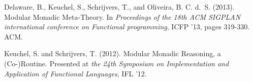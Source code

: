 \begin{center}
  \begin{minipage}{0.8\columnwidth}
    Delaware, B., Keuchel, S., Schrijvers, T., and Oliveira,
    B. C. d.~S. (2013).
    \newblock Modular Monadic Meta-Theory.
    \newblock In {\em Proceedings of the 18th ACM SIGPLAN international
      conference on Functional programming}, ICFP '13, pages 319-330. ACM.
  \end{minipage}
\end{center}

\begin{center}
  \begin{minipage}{0.8\columnwidth}
    Keuchel, S. and Schrijvers, T. (2012).
    \newblock Modular Monadic Reasoning, a (Co-)Routine.
    \newblock Presented at \emph{the 24th Symposium on Implementation and
      Application of Functional Languages}, IFL '12.
  \end{minipage}
\end{center}



